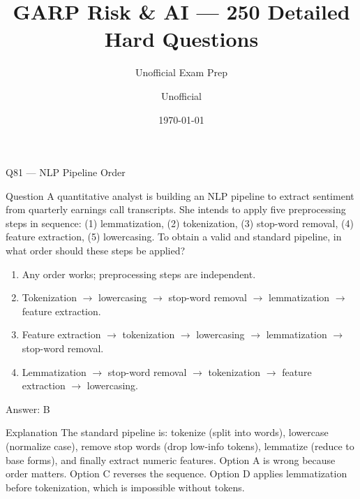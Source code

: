 \documentclass[aspectratio=169,8pt]{beamer}
\title[GARP RAI]{GARP Risk \& AI --- 250 Detailed Hard Questions}
\subtitle{Unofficial Exam Prep}
\author{Unofficial}
\date{\today}
\begin{document}
	

\begin{frame}{Q81 --- NLP Pipeline Order}
\begin{block}{Question}
A quantitative analyst is building an NLP pipeline to extract sentiment from quarterly earnings call transcripts. She intends to apply five preprocessing steps in sequence: (1) lemmatization, (2) tokenization, (3) stop-word removal, (4) feature extraction, (5) lowercasing. To obtain a valid and standard pipeline, in what order should these steps be applied?
\end{block}
\begin{enumerate}
\item Any order works; preprocessing steps are independent.
\item Tokenization $\to$ lowercasing $\to$ stop-word removal $\to$ lemmatization $\to$ feature extraction.
\item Feature extraction $\to$ tokenization $\to$ lowercasing $\to$ lemmatization $\to$ stop-word removal.
\item Lemmatization $\to$ stop-word removal $\to$ tokenization $\to$ feature extraction $\to$ lowercasing.
\end{enumerate}
\begin{exampleblock}{Answer: B}\end{exampleblock}
\begin{block}{Explanation}
The standard pipeline is: tokenize (split into words), lowercase (normalize case), remove stop words (drop low-info tokens), lemmatize (reduce to base forms), and finally extract numeric features. Option A is wrong because order matters. Option C reverses the sequence. Option D applies lemmatization before tokenization, which is impossible without tokens.
\end{block}
\end{frame}
\end{document}
